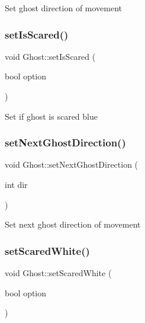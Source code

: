 Set ghost direction of movement \mbox{\label{class_ghost_a6e6f3e5ff87c2c9efeb58c188530f431}} 
\subsubsection{\texorpdfstring{set\+Is\+Scared()}{setIsScared()}}
{\footnotesize\ttfamily void Ghost\+::set\+Is\+Scared (\begin{DoxyParamCaption}\item[{bool}]{option }\end{DoxyParamCaption})\hspace{0.3cm}{\ttfamily [inline]}}

Set if ghost is scared blue \mbox{\label{class_ghost_a3db876d86c02629c3a1aca84f63d4b70}} 
\subsubsection{\texorpdfstring{set\+Next\+Ghost\+Direction()}{setNextGhostDirection()}}
{\footnotesize\ttfamily void Ghost\+::set\+Next\+Ghost\+Direction (\begin{DoxyParamCaption}\item[{int}]{dir }\end{DoxyParamCaption})\hspace{0.3cm}{\ttfamily [inline]}}

Set next ghost direction of movement \mbox{\label{class_ghost_a22197187d8c42a2a2d2f0facdda54356}} 
\subsubsection{\texorpdfstring{set\+Scared\+White()}{setScaredWhite()}}
{\footnotesize\ttfamily void Ghost\+::set\+Scared\+White (\begin{DoxyParamCaption}\item[{bool}]{option }\end{DoxyParamCaption})\hspace{0.3cm}{\ttfamily [inline]}}

